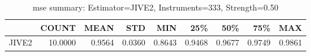 \begin{table}[ht]
\centering
\caption{mse summary: Estimator=JIVE2, Instruments=333, Strength=0.50}
\begin{tabular}{lrrrrrrrr}
\toprule
 & COUNT & MEAN & STD & MIN & 25\% & 50\% & 75\% & MAX \\
\midrule
JIVE2 & 10.0000 & 0.9564 & 0.0360 & 0.8643 & 0.9468 & 0.9677 & 0.9749 & 0.9861 \\
\bottomrule
\end{tabular}
\end{table}

